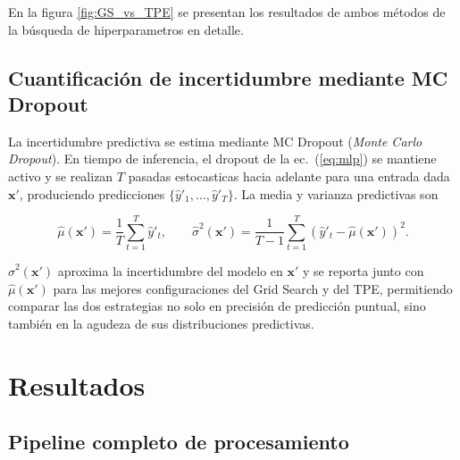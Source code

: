 \documentclass[12pt, letterpaper]{article}
\begin{document}
En la figura \ref{fig:GS_vs_TPE} se presentan los resultados de ambos métodos de la búsqueda de hiperparametros en detalle.

\subsection{Cuantificación de incertidumbre mediante MC Dropout}

La incertidumbre predictiva se estima mediante MC Dropout (\textit{Monte Carlo Dropout}). En tiempo de inferencia, el dropout de la ec.~(\ref{eq:mlp}) se mantiene activo y se realizan $T$ pasadas estocasticas hacia adelante para una entrada dada $\mathbf{x}'$, produciendo predicciones $\{\hat{y}'_1, \dots, \hat{y}'_T\}$. La media y varianza predictivas son

\begin{equation}
  \hat{\mu}(\mathbf{x}') = \frac{1}{T}\sum_{t=1}^{T}\hat{y}'_t, \qquad
  \hat{\sigma}^2(\mathbf{x}') = \frac{1}{T-1}\sum_{t=1}^{T}\left(\hat{y}'_t - \hat{\mu}(\mathbf{x}')\right)^2.
  \label{eq:mcdropout}
\end{equation}

$\hat{\sigma}^2(\mathbf{x}')$ aproxima la incertidumbre del modelo en $\mathbf{x}'$ y se reporta junto con $\hat{\mu}(\mathbf{x}')$ para las mejores configuraciones del Grid Search y del TPE, permitiendo comparar las dos estrategias no solo en precisión de predicción puntual, sino también en la agudeza de sus distribuciones predictivas.

\section{Resultados}

\subsection{Pipeline completo de procesamiento}
\end{document}
